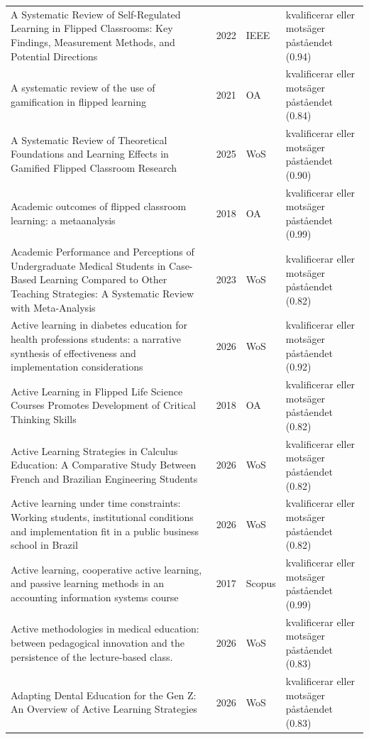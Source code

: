 \begin{longtable}{@{}%
  >{\raggedright\arraybackslash}p{}c%
  >{\raggedright\arraybackslash}p{}%
  >{\raggedright\arraybackslash}p{}@{}}
A Systematic Review of Self-Regulated Learning in Flipped Classrooms: Key Findings, Measurement Methods, and Potential Directions & 2022 & IEEE & kvalificerar eller motsäger påståendet (0.94) \\
A systematic review of the use of gamification in flipped learning & 2021 & OA & kvalificerar eller motsäger påståendet (0.84) \\
A Systematic Review of Theoretical Foundations and Learning Effects in Gamified Flipped Classroom Research & 2025 & WoS & kvalificerar eller motsäger påståendet (0.90) \\
Academic outcomes of flipped classroom learning: a metaanalysis & 2018 & OA & kvalificerar eller motsäger påståendet (0.99) \\
Academic Performance and Perceptions of Undergraduate Medical Students in Case-Based Learning Compared to Other Teaching Strategies: A Systematic Review with Meta-Analysis & 2023 & WoS & kvalificerar eller motsäger påståendet (0.82) \\
Active learning in diabetes education for health professions students: a narrative synthesis of effectiveness and implementation considerations & 2026 & WoS & kvalificerar eller motsäger påståendet (0.92) \\
Active Learning in Flipped Life Science Courses Promotes Development of Critical Thinking Skills & 2018 & OA & kvalificerar eller motsäger påståendet (0.82) \\
Active Learning Strategies in Calculus Education: A Comparative Study Between French and Brazilian Engineering Students & 2026 & WoS & kvalificerar eller motsäger påståendet (0.82) \\
Active learning under time constraints: Working students, institutional conditions and implementation fit in a public business school in Brazil & 2026 & WoS & kvalificerar eller motsäger påståendet (0.82) \\
Active learning, cooperative active learning, and passive learning methods in an accounting information systems course & 2017 & Scopus & kvalificerar eller motsäger påståendet (0.99) \\
Active methodologies in medical education: between pedagogical innovation and the persistence of the lecture-based class. & 2026 & WoS & kvalificerar eller motsäger påståendet (0.83) \\
Adapting Dental Education for the Gen Z: An Overview of Active Learning Strategies & 2026 & WoS & kvalificerar eller motsäger påståendet (0.83) \\

\end{longtable}
